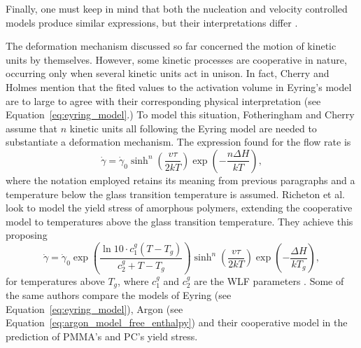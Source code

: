 Finally, one must keep in mind that both the nucleation and velocity controlled models produce similar expressions, but their interpretations differ \citep{fotheringhamRoleRecoveryForces1978}.

The deformation mechanism discussed so far concerned the motion of kinetic units by themselves.
However, some kinetic processes are cooperative in nature, occurring only when several kinetic units act in unison.
In fact, Cherry and Holmes \citep{cherryYieldAdhesiveJoints1969} mention that the fited values to the activation volume in Eyring's model are to large to agree with their corresponding physical interpretation (see Equation~\eqref{eq:eyring_model}.)
To model this situation, Fotheringham and Cherry \citep{fotheringhamCommentCompressionYield1976, fotheringhamRoleRecoveryForces1978} assume that $n$ kinetic units all following the Eyring model are needed to substantiate a deformation mechanism.
The expression found for the flow rate is
\begin{equation}
	\dot{\gamma}=\dot \gamma_0 \sinh ^n\left(\frac{v \tau}{2 k T}\right) \exp \left(-\frac{n \Delta H}{k T}\right),
\end{equation}
where the notation employed retains its meaning from previous paragraphs and a temperature below the glass transition temperature is assumed.
Richeton et al. \citep{richetonFormulationCooperativeModel2005} look to model the yield stress of amorphous polymers, extending the cooperative model to temperatures above the glass transition temperature.
They achieve this proposing
\begin{equation}
		\dot{\gamma}=\dot \gamma_0 \exp\left(\frac{\ln 10\cdot c_1^g(T - T_g)}{c_2^g + T - T_g}\right) \sinh ^n\left(\frac{v \tau}{2 k T}\right) \exp \left(-\frac{\Delta H}{k T_g}\right),
\end{equation}
for temperatures above $T_g$, where $c_1^g$ and $c_2^g$ are the WLF parameters \citep{wardIntroductionMechanicalProperties2004}.
Some of the same authors \citep{richetonThermodynamicInvestigationYieldstress2007} compare the models of Eyring (see Equation~\eqref{eq:eyring_model}), Argon (see Equation~\eqref{eq:argon_model_free_enthalpy}) and their cooperative model in the prediction of PMMA's and PC's yield stress.

